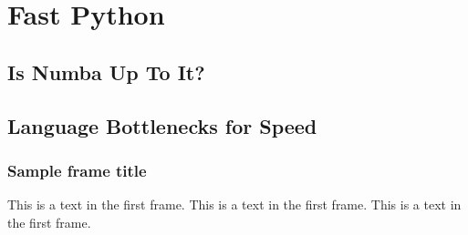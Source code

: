 \section{Fast Python}
\subsection{Is Numba Up To It?}
\subsection{Language Bottlenecks for Speed}

\begin{frame}
\frametitle{Sample frame title}
This is a text in the first frame. This is a text in the first frame. This is a text in the first frame.
\end{frame}
